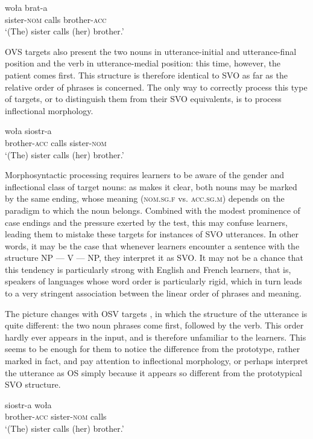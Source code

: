 \ea%
    \label{ex:05:1}
       {woła}   {brat-a}\\
            sister-\textsc{nom}   calls  brother-\textsc{acc}\\
    \glt    `(The) sister calls (her) brother.'
    \z

OVS targets also present the two nouns in utterance-initial and utterance-final position and the verb in utterance-medial position: this time, however, the patient comes first. This structure is therefore identical to SVO as far as the relative order of phrases is concerned. The only way to correctly process this type of targets, or to distinguish them from their SVO equivalents, is to process inflectional morphology.  

\ea%
    \label{ex:05:2}
         {woła}  {siostr-a}\\
            brother-\textsc{acc}  calls  sister-\textsc{nom}\\
    \glt    `(The) sister calls (her) brother.'
    \z

Morphosyntactic processing requires learners to be aware of the gender and inflectional class of target nouns: as  makes it clear, both nouns may be marked by the same ending, whose meaning (\textsc{nom.sg.f} vs. \textsc{acc.sg.m}) depends on the paradigm to which the noun belongs. Combined with the modest prominence of case endings and the pressure exerted by the test, this may confuse learners, leading them to mistake these targets for instances of SVO utterances. In other words, it may be the case that whenever learners encounter a sentence with the structure NP — V — NP, they interpret it as SVO. It may not be a chance that this tendency is particularly strong with English and French learners, that is, speakers of languages whose word order is particularly rigid, which in turn leads to a very stringent association between the linear order of phrases and meaning.

The picture changes with OSV targets , in which the structure of the utterance is quite different: the two noun phrases come first, followed by the verb. This order hardly ever appears in the input, and is therefore unfamiliar to the learners. This seems to be enough for them to notice the difference from the prototype, rather marked in fact, and pay attention to inflectional morphology, or perhaps interpret the utterance as OS simply because it appears so different from the prototypical SVO structure. 

\ea%
    \label{ex:05:3}
         {siostr-a}   {woła}\\
            brother-\textsc{acc}  sister-\textsc{nom}  calls\\
    \glt    `(The) sister calls (her) brother.'
    \z

